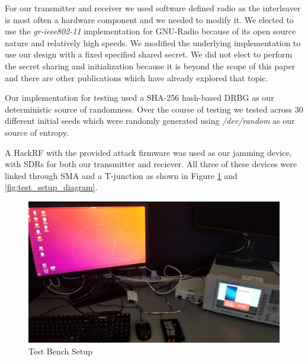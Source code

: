 \documentclass[sigconf]{acmart}
\begin{document}
For our transmitter and receiver we used software defined radio as the interleaver is most often a hardware component and we needed to modify it. We elected to use the \textit{gr-ieee802-11} implementation for GNU-Radio because of its open source nature and relatively high speeds\cite{gr_ieee802}. We modified the underlying implementation to use our design with a fixed specified shared secret. We did not elect to perform the secret sharing and initialization because it is beyond the scope of this paper and there are other publications which have already explored that topic. 

Our implementation for testing used a SHA-256 hash-based DRBG as our deterministic source of randomness. Over the course of testing we tested across 30 different initial seeds which were randomly generated using \textit{/dev/random} as our source of entropy. 

A HackRF with the provided attack firmware was used as our jamming device, with SDRs for both our transmitter and reciever. All three of these devices were linked through SMA and a T-junction as shown in Figure \ref{fig:test_setup} and \ref{fig:test_setup_diagram}.

\begin{figure}[ht]
    \centering
    \includegraphics[width=\linewidth]{test_bench.jpg}
    \caption{Test Bench Setup}
    \label{fig:test_setup}
\end{figure}
\end{document}
